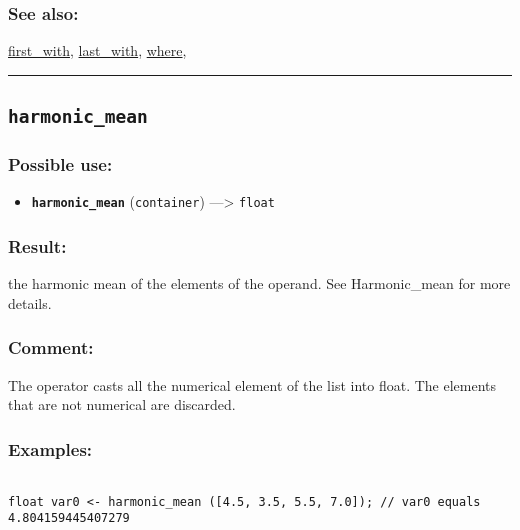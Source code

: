 \documentclass[]{book}
\providecommand{\tightlist}{%
  \setlength{\itemsep}{0pt}\setlength{\parskip}{0pt}}
\theoremstyle{definition}
\theoremstyle{definition}
\theoremstyle{definition}
\theoremstyle{remark}
\begin{document}
\subsubsection{See also:}\label{see-also-109}

\href{OperatorsDH\#first_with}{first\_with},
\href{OperatorsIM\#last_with}{last\_with},
\href{OperatorsSZ\#where}{where},

\begin{center}\rule{0.5\linewidth}{\linethickness}\end{center}

\subsection{\texorpdfstring{\texttt{harmonic\_mean}}{harmonic\_mean}}\label{harmonic_mean}

\subsubsection{Possible use:}\label{possible-use-245}

\begin{itemize}
\tightlist
\item
  \textbf{\texttt{harmonic\_mean}} (\texttt{container})
  ---\textgreater{} \texttt{float}
\end{itemize}

\subsubsection{Result:}\label{result-236}

the harmonic mean of the elements of the operand. See Harmonic\_mean for
more details.

\subsubsection{Comment:}\label{comment-47}

The operator casts all the numerical element of the list into float. The
elements that are not numerical are discarded.

\subsubsection{Examples:}\label{examples-185}

\begin{verbatim}
 
float var0 <- harmonic_mean ([4.5, 3.5, 5.5, 7.0]); // var0 equals 4.804159445407279
\end{verbatim}
\end{document}

